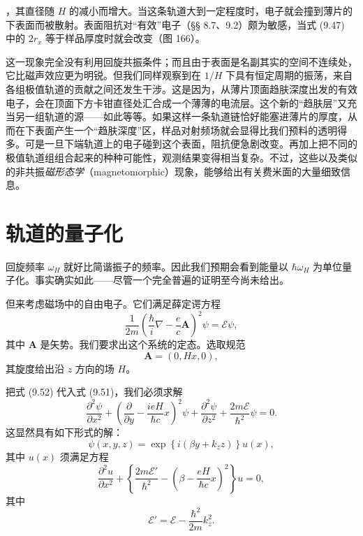 ，其直径随 $H$ 的减小而增大。当这条轨道大到一定程度时，电子就会撞到薄片的下表面而被散射。表面阻抗对“有效”电子（§§ 8.7、9.2）颇为敏感，当式 (9.47) 中的 $2r_{x}$ 等于样品厚度时就会改变（图 166）。

这一现象完全没有利用回旋共振条件；而且由于表面是名副其实的空间不连续处，它比磁声效应更为明锐。但我们同样观察到在 $1/H$ 下具有恒定周期的振荡，来自各组极值轨道的贡献之间还发生干涉。这是因为，从薄片顶面趋肤深度出发的有效电子，会在顶面下方卡钳直径处汇合成一个薄薄的电流层。这个新的“趋肤层”又充当另一组轨道的源——如此等等。如果这样一条轨道链恰好能塞进薄片的厚度，从而在下表面产生一个“趋肤深度”区，样品对射频场就会显得比我们预料的透明得多。可是一旦下端轨道上的电子碰到这个表面，阻抗便急剧改变。再加上把不同的极值轨道组组合起来的种种可能性，观测结果变得相当复杂。不过，这些以及类似的非共振\emph{磁形态学}（magnetomorphic）现象，能够给出有关费米面的大量细致信息。

\section{轨道的量子化}

回旋频率 $\omega_{H}$ 就好比简谐振子的频率。因此我们预期会看到能量以 $\hbar\omega_{H}$ 为单位量子化。事实确实如此——尽管一个完全普遍的证明至今尚未给出。

但来考虑磁场中的自由电子。它们满足薛定谔方程
\begin{equation*}
\frac{1}{2m}\left(\frac{\hbar}{i}\nabla-\frac{e}{c}\mathbf{A}\right)^{2}\psi=\mathcal{E}\psi,
\tag{9.51}
\end{equation*}
其中 $\mathbf{A}$ 是矢势。我们要求出这个系统的定态。选取规范
\begin{equation*}
\mathbf{A}=(0,Hx,0),
\tag{9.52}
\end{equation*}
其旋度给出沿 $z$ 方向的场 $H$。

把式 (9.52) 代入式 (9.51)，我们必须求解
\begin{equation*}
\frac{\partial^{2}\psi}{\partial x^{2}}+\left(\frac{\partial}{\partial y}-\frac{ieH}{\hbar c}x\right)^{2}\psi+\frac{\partial^{2}\psi}{\partial z^{2}}+\frac{2m\mathcal{E}}{\hbar^{2}}\psi=0.
\tag{9.53}
\end{equation*}
这显然具有如下形式的解：
\begin{equation*}
\psi(x,y,z)=\exp\left\{i(\beta y+k_{z}z)\right\}u(x),
\tag{9.54}
\end{equation*}
其中 $u(x)$ 须满足方程
\begin{equation*}
\frac{\partial^{2}u}{\partial x^{2}}+\left\{\frac{2m\mathcal{E}'}{\hbar^{2}}-\left(\beta-\frac{eH}{\hbar c}x\right)^{2}\right\}u=0,
\tag{9.55}
\end{equation*}
其中
\begin{equation*}
\mathcal{E}'=\mathcal{E}-\frac{\hbar^{2}}{2m}k_{z}^{2}.
\tag{9.56}
\end{equation*}

